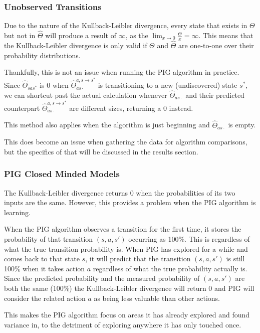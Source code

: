 \documentclass[12pt]{thesis}
\begin{document}
\subsubsection{Unobserved Transitions}
Due to the nature of the Kullback-Leibler divergence, every state that exists in $\Theta$ but not in $\hat{\Theta}$ will produce a result of $\infty$, as the $\lim_{x \rightarrow 0} \frac{\Theta}{x} = \infty$. This means that the Kullback-Leibler divergence is only valid if $\Theta$ and $\hat{\Theta}$ are one-to-one over their probability distributions.

Thankfully, this is not an issue when running the PIG algorithm in practice. Since $\hat{\Theta}_{sas^{*}}$ is 0 when $\hat{\Theta}_{as\cdot}^{a,s \rightarrow s^{*}}$ is transitioning to a new (undiscovered) state $s^{*}$, we can shortcut past the actual calculation whenever  $\hat{\Theta}_{as\cdot}$ and their predicted counterpart $\hat{\Theta}_{as\cdot}^{a,s \rightarrow s^{*}}$ are different sizes, returning a 0 instead.

This method also applies when the algorithm is just beginning and $\hat{\Theta}_{as\cdot}$ is empty.

This does become an issue when gathering the data for algorithm comparisons, but the specifics of that will be discussed in the results section.

\subsubsection{PIG Closed Minded Models}
The Kullback-Leibler divergence returns 0 when the probabilities of its two inputs are the same. However, this provides a problem when the PIG algorithm is learning.

When the PIG algorithm observes a transition for the first time, it stores the probability of that transition $(s,a,s')$ occurring as 100\%. This is regardless of what the true transition probability is. When PIG has explored for a while and comes back to that state $s$, it will predict that the transition $(s,a,s')$ is still 100\% when it takes action $a$ regardless of what the true probability actually is. Since the predicted probability and the measured probability of $(s,a,s')$ are both the same (100\%) the Kullback-Leibler divergence will return 0 and PIG will consider the related action $a$ as being less valuable than other actions.

This makes the PIG algorithm focus on areas it has already explored and found variance in, to the detriment of exploring anywhere it has only touched once.
\end{document}
